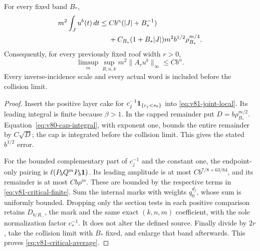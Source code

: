 \begin{theorem}
\label{thm:v81-critical-volume}
For every fixed band $B_*$,
\begin{align}
 m^2\int_Ju^b(t)\,dt
 \le{}&Cb^\alpha(|J|+B_*^{-1})\notag\\
 &+C_{B_*}(1+B_*|J|)m^2 b^{1/2}\rho_{B_*}^{m/4}.
                                      \label{eq:v81-critical-finite}
\end{align}
Consequently, for every previously fixed roof width $r>0$,
\begin{equation}\label{eq:v81-critical-average}
       \limsup_m\sup_{R,n,k}m^2\|A_ru^b\|_\infty\le Cb^\alpha.
\end{equation}
Every inverse-incidence scale and every actual word is included
before the collision limit.
\end{theorem}
\begin{proof}
Insert the positive layer cake for
$c_j^{-1}\mathbf1_{\{c_j<s_0\}}$ into
\eqref{eq:v81-joint-local}. Its leading integral is finite because
$\beta>1$. In the capped remainder put $D=b\rho_{B_*}^{m/2}$.
Equation~\eqref{eq:v80-cap-integral}, with exponent one, bounds the
entire remainder by $C\sqrt D$; the cap is integrated before the
collision limit. This gives the stated $b^{1/2}$ error.

For the bounded complementary part of $c_j^{-1}$ and the constant
one, the endpoint-only pairing is $\ell(P_bQ^mP_b\mathbf1)$.
Its leading amplitude is at most
$Cb^{7/8+63/64}$, and its remainder is at most
$Cb\rho^m$. These are bounded by the respective terms in
\eqref{eq:v81-critical-finite}. Sum the internal marks with
weights $q_0^{d_j}$, whose sum is uniformly bounded. Dropping only
the section tests in each positive comparison retains $D_{b/R_-}$,
the mark and the same exact $(k,n,m)$ coefficient, with the sole
normalization factor $c_*^{-1}$. It does not alter the defined source.
Finally divide by $2r$, take the collision limit with $B_*$ fixed,
and enlarge that band afterwards. This proves
\eqref{eq:v81-critical-average}.
\end{proof}

